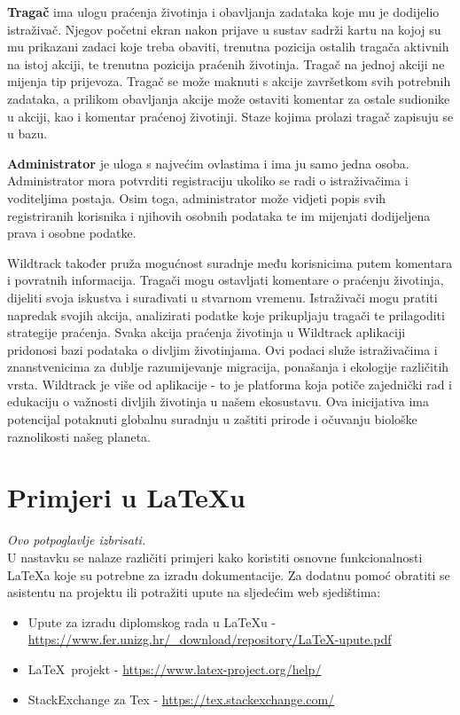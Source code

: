 		\textbf{Tragač} ima ulogu praćenja životinja i obavljanja zadataka koje mu je dodijelio istraživač. Njegov početni ekran nakon prijave u sustav sadrži kartu na kojoj su mu prikazani zadaci koje treba obaviti, trenutna pozicija ostalih tragača aktivnih na istoj akciji, te trenutna pozicija praćenih životinja. Tragač na jednoj akciji ne mijenja tip prijevoza. Tragač se može maknuti s akcije završetkom svih potrebnih zadataka, a prilikom obavljanja akcije može ostaviti komentar za ostale sudionike u akciji, kao i komentar praćenoj životinji. Staze kojima prolazi tragač zapisuju se u bazu. \newline
		
		\textbf{Administrator} je uloga s najvećim ovlastima i ima ju samo jedna osoba. Administrator mora potvrditi registraciju ukoliko se radi o istraživačima i voditeljima postaja. Osim toga, administrator može vidjeti popis svih registriranih korisnika i njihovih osobnih podataka te im mijenjati dodijeljena prava i osobne podatke. \newline
		
		Wildtrack također pruža mogućnost suradnje među korisnicima putem komentara i povratnih informacija. Tragači mogu ostavljati komentare o praćenju životinja, dijeliti svoja iskustva i surađivati u stvarnom vremenu. Istraživači mogu pratiti napredak svojih akcija, analizirati podatke koje prikupljaju tragači te prilagoditi strategije praćenja. Svaka akcija praćenja životinja u Wildtrack aplikaciji pridonosi bazi podataka o divljim životinjama. Ovi podaci služe istraživačima i znanstvenicima za dublje razumijevanje migracija, ponašanja i ekologije različitih vrsta. Wildtrack je više od aplikacije - to je platforma koja potiče zajednički rad i edukaciju o važnosti divljih životinja u našem ekosustavu. Ova inicijativa ima potencijal potaknuti globalnu suradnju u zaštiti prirode i očuvanju biološke raznolikosti našeg planeta. \newline
		
		
		\section{Primjeri u \LaTeX u}
		
		\textit{Ovo potpoglavlje izbrisati.}\\

		U nastavku se nalaze različiti primjeri kako koristiti osnovne funkcionalnosti \LaTeX a koje su potrebne za izradu dokumentacije. Za dodatnu pomoć obratiti se asistentu na projektu ili potražiti upute na sljedećim web sjedištima:
		\begin{itemize}
			\item Upute za izradu diplomskog rada u \LaTeX u - \url{https://www.fer.unizg.hr/_download/repository/LaTeX-upute.pdf}
			\item \LaTeX\ projekt - \url{https://www.latex-project.org/help/}
			\item StackExchange za Tex - \url{https://tex.stackexchange.com/}\\
		
		\end{itemize} 	


